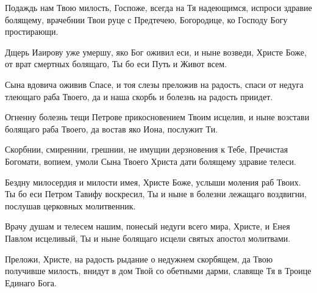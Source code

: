 \begin{mymulticols}
\inyne

Подаждь нам Твою милость, Госпоже, всегда на Тя надеющимся, испроси здравие болящему, врачебнии Твои руце с Предтечею, Богородице, ко Господу Богу простирающи.






Дщерь Иаирову уже умершу, яко Бог оживил еси, и ныне возведи, Христе Боже, от врат смертных болящаго, Ты бо еси Путь и Живот всем.


Сына вдовича оживив Спасе, и тоя слезы преложив на радость, спаси от недуга тлеющаго раба Твоего, да и наша скорбь и болезнь на радость приидет.

\slava

Огненну болезнь тещи Петрове прикосновением Твоим исцелив, и ныне возстави болящаго раба Твоего, да востав яко Иона, послужит Ти.

\inyne

Скорбнии, смиреннии, грешнии, не имущии дерзновения к Тебе, Пречистая Богомати, вопием, умоли Сына Твоего Христа дати болящему здравие телеси.






Бездну милосердия и милости имея, Христе Боже, услыши моления раб Твоих. Ты бо еси Петром Тавифу воскресил, Ты и ныне в болезни лежащаго воздвигни, послушав церковных молитвенник.


Врачу душам и телесем нашим, понесый недуги всего мира, Христе, и Енея Павлом исцеливый, Ты и ныне болящаго исцели святых апостол молитвами.

\slava

Преложи, Христе, на радость рыдание о недужнем скорбящем, да Твою получивше милость, внидут в дом Твой со обетными дарми, славяще Тя в Троице Единаго Бога.


\end{mymulticols}
